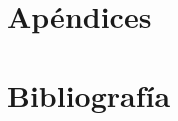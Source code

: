 \documentclass[12pt,fleqn]{book} %
\begin{document}
\part{Apéndices}

\appendix

%
%


\part{Bibliografía}








\end{document}
